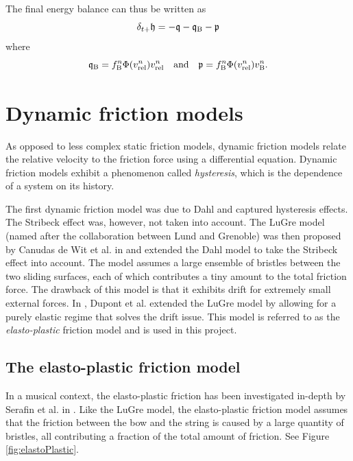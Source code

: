 The final energy balance can thus be written as
\begin{equation}\label{eq:energyBalanceBow}
    \delta_{t+} \mathfrak{h} = -\mathfrak{q} - \mathfrak{q}_\text{B} - \mathfrak{p} 
\end{equation}
where 
\begin{equation*}
    \mathfrak{q}_\text{B} = f_{\text{B}}^n \Phi(v_\text{rel}^n) v_\text{rel}^n \quad \text{and} \quad \mathfrak{p} = f_{\text{B}}^n \Phi(v_\text{rel}^n)v_{\text{B}}^n.
\end{equation*}

\section{Dynamic friction models}
As opposed to less complex static friction models, dynamic friction models relate the relative velocity to the friction force using a differential equation. Dynamic friction models exhibit a phenomenon called \textit{hysteresis}, which is the dependence of a system on its history. 

The first dynamic friction model was due to Dahl \cite{Dahl1968} and captured hysteresis effects. The Stribeck effect was, however, not taken into account. The LuGre model (named after the collaboration between Lund and Grenoble) was then proposed by Canudas de Wit et al. in \cite{Canudas1993, Canudas1995} and extended the Dahl model to take the Stribeck effect into account. The model assumes a large ensemble of bristles between the two sliding surfaces, each of which contributes a tiny amount to the total friction force. The drawback of this model is that it exhibits drift for extremely small external forces. In \cite{Dupont2002}, Dupont et al. extended the LuGre model by allowing for a purely elastic regime that solves the drift issue. This model is referred to as the \textit{elasto-plastic} friction model and is used in this project.

\subsection{The elasto-plastic friction model}
In a musical context, the elasto-plastic friction has been investigated in-depth by Serafin et al. in \cite{Serafin2003, Serafin2004, Avanzini2005}. Like the LuGre model, the elasto-plastic friction model assumes that the friction between the bow and the string is caused by a large quantity of bristles, all contributing a fraction of the total amount of friction. See Figure \ref{fig:elastoPlastic}.



